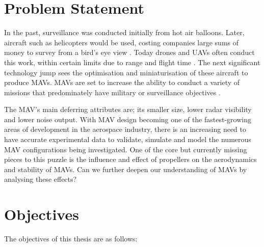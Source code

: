 
% 





\section{Problem Statement}
\label{ProblemStatement}

In the past, surveillance was conducted initially from hot air balloons. Later, aircraft such as helicopters would be used, costing companies large sums of money to survey from a bird's eye view \cite{Aleksander2018}. Today drones and \acrshort{UAV}s often conduct this work, within certain limits due to range and flight time \cite{NONAMI2007, Aleksander2018}. The next significant technology jump sees the optimisation and miniaturisation of these aircraft to produce \acrshort{MAV}s. \acrshort{MAV}s are set to increase the ability to conduct a variety of missions that predominately have military or surveillance objectives \cite{Aleksander2018, Mil2022, Greenwood2019, Saytov2022}. 

The \acrshort{MAV}'s main deferring attributes are; its smaller size, lower radar visibility and lower noise output. With \acrshort{MAV} design becoming one of the fastest-growing areas of development in the aerospace industry, there is an increasing need to have accurate experimental data to validate, simulate and model the numerous \acrshort{MAV} configurations being investigated. One of the core but currently missing pieces to this puzzle is the influence and effect of propellers on the aerodynamics and stability of \acrshort{MAV}s. Can we further deepen our understanding of \acrshort{MAV}s by analysing these effects?




\section{Objectives}
\label{sec:Objectives}
The objectives of this thesis are as follows:

